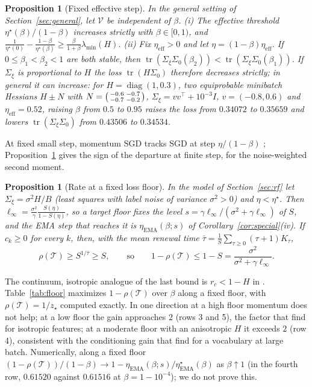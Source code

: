 \documentclass[11pt]{article}
\newtheorem{proposition}[theorem]{Proposition}
\theoremstyle{remark}
\newcommand{\tr}{\operatorname{tr}}
\newcommand{\T}{\mathcal T}
\newcommand{\V}{\mathcal V}
\begin{document}
\begin{proposition}[Fixed effective step]\label{prop:eff}
In the general setting of Section~\ref{sec:general}, let $\V$ be independent of $\beta$. (i) The effective threshold $\eta^\star(\beta)/(1-\beta)$ increases strictly with $\beta\in[0,1)$, and $\frac1{\eta^\star(0)}-\frac{1-\beta}{\eta^\star(\beta)}\ge\frac{\beta}{1+\beta}\lambda_{\min}(H)$. (ii) Fix $\eta_{\mathrm{eff}}>0$ and let $\eta=(1-\beta)\eta_{\mathrm{eff}}$. If $0\le\beta_1<\beta_2<1$ are both stable, then $\tr(\Sigma_\xi\Sigma_0(\beta_2))<\tr(\Sigma_\xi\Sigma_0(\beta_1))$. If $\Sigma_\xi$ is proportional to $H$ the loss $\tr(H\Sigma_0)$ therefore decreases strictly; in general it can increase: for $H=\operatorname{diag}(1,0.3)$, two equiprobable minibatch Hessians $H\pm N$ with $N=\begin{psmallmatrix}-0.6&-0.7\\-0.7&-0.2\end{psmallmatrix}$, $\Sigma_\xi=vv^\top+10^{-3}I$, $v=(-0.8,0.6)$ and $\eta_{\mathrm{eff}}=0.52$, raising $\beta$ from $0.5$ to $0.95$ raises the loss from $0.34072$ to $0.35659$ and lowers $\tr(\Sigma_\xi\Sigma_0)$ from $0.43506$ to $0.34534$.
\end{proposition}

At fixed small step, momentum SGD tracks SGD at step $\eta/(1-\beta)$ \citep{yuan2016momentum}; Proposition~\ref{prop:eff} gives the sign of the departure at finite step, for the noise-weighted second moment.

\begin{proposition}[Rate at a fixed loss floor]\label{prop:floor}
In the model of Section~\ref{sec:rf} let $\Sigma_\xi=\sigma^2H/B$ (least squares with label noise of variance $\sigma^2>0$) and $\eta<\eta^\star$. Then $\ell_\infty=\frac{\sigma^2}{\gamma}\frac{S(\eta)}{1-S(\eta)}$, so a target floor fixes the level $s=\gamma\ell_\infty/(\sigma^2+\gamma\ell_\infty)$ of $S$, and the EMA step that reaches it is $\eta_{\mathrm{EMA}}(\beta;s)$ of Corollary~\ref{cor:special}(iv). If $c_k\ge0$ for every $k$, then, with the mean renewal time $\bar\tau=\frac1S\sum_{\tau\ge0}(\tau+1)K_\tau$,
\[
\rho(\T)\ge S^{1/\bar\tau}\ge S,\qquad\text{so}\qquad 1-\rho(\T)\le1-S=\frac{\sigma^2}{\sigma^2+\gamma\ell_\infty}.
\]
\end{proposition}
The continuum, isotropic analogue of the last bound is $r_c<1-H$ in \citet[Lemma~C.5(c)]{everett2026sparse}. Table~\ref{tab:floor} maximizes $1-\rho(\T)$ over $\beta$ along a fixed floor, with $\rho(\T)=1/z_\star$ computed exactly. In one direction at a high floor momentum does not help; at a low floor the gain approaches $2$ (rows 3 and 5), the factor that \citet[Proposition~H.10]{everett2026sparse} find for isotropic features; at a moderate floor with an anisotropic $H$ it exceeds $2$ (row 4), consistent with the conditioning gain that \citet[Proposition~2]{everett2026sparse} find for a vocabulary at large batch. Numerically, along a fixed floor $(1-\rho(\T))/(1-\beta)\to1-\eta_{\mathrm{EMA}}(\beta;s)/\eta^\star_{\mathrm{EMA}}(\beta)$ as $\beta\uparrow1$ (in the fourth row, $0.61520$ against $0.61516$ at $\beta=1-10^{-4}$); we do not prove this.
\end{document}
